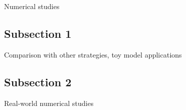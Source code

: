 Numerical studies

\subsection{Subsection 1}
Comparison with other strategies, toy model applications

\subsection{Subsection 2}
Real-world numerical studies